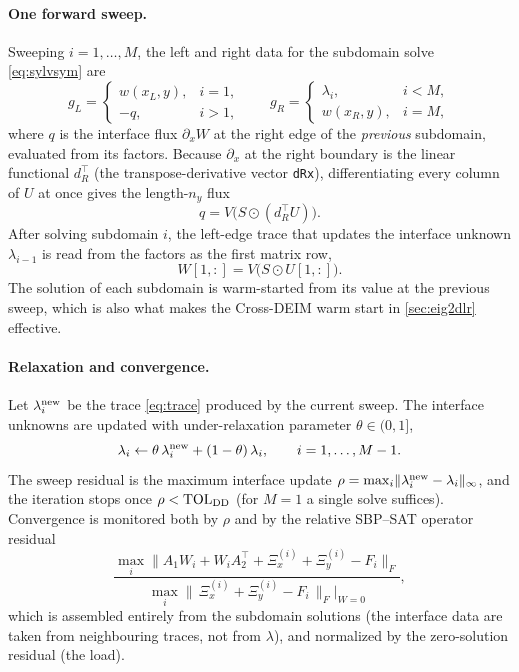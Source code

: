 \documentclass[hidelinks,onefignum,onetabnum]{siamart250211}
\newcommand{\Aone}{A_1}
\newcommand{\Atwo}{A_2}
\newcommand{\fro}[1]{\lVert #1 \rVert_{F}}
\newcommand{\TOL}{\mathrm{TOL}}
\begin{document}
\paragraph{One forward sweep.}  Sweeping $i=1,\dots,M$, the left and right data
for the subdomain solve \cref{eq:sylvsym} are
\begin{equation}
\label{eq:dndata}
g_L =
\begin{cases}
 w(x_L, y), & i=1,\\
 -q, & i>1,
\end{cases}
\qquad
g_R =
\begin{cases}
 \lambda_i, & i<M,\\
 w(x_R, y), & i=M,
\end{cases}
\end{equation}
where $q$ is the interface flux $\partial_x W$ at the right edge of the
\emph{previous} subdomain, evaluated from its factors.  Because $\partial_x$ at
the right boundary is the linear functional $d_R^{\!\top}$ (the
transpose-derivative vector {\tt dRx}), differentiating every column of $U$ at
once gives the length-$n_y$ flux
\begin{equation}
\label{eq:flux}
q = V\bigl(S \odot (d_R^{\!\top} U)\bigr).
\end{equation}
After solving subdomain $i$, the left-edge trace that updates the interface
unknown $\lambda_{i-1}$ is read from the factors as the first matrix row,
\begin{equation}
\label{eq:trace}
W[1,:] = V\bigl(S \odot U[1,:]\bigr).
\end{equation}
The solution of each subdomain is warm-started from its value at the previous
sweep, which is also what makes the Cross-DEIM warm start in
\cref{sec:eig2dlr} effective.

\paragraph{Relaxation and convergence.}  Let $\lambda_i^{\rm new}$ be the trace
\cref{eq:trace} produced by the current sweep.  The interface unknowns are
updated with under-relaxation parameter $\theta\in(0,1]$,
\begin{equation}
\label{eq:relax}
\lambda_i \leftarrow \theta\,\lambda_i^{\rm new} + (1-\theta)\,\lambda_i,
\qquad i=1,\dots,M-1.
\end{equation}
The sweep residual is the maximum interface update
$\rho = \max_i \lVert \lambda_i^{\rm new} - \lambda_i\rVert_\infty$, and the
iteration stops once $\rho < \TOL_{\rm DD}$ (for $M=1$ a single solve suffices).
Convergence is monitored both by $\rho$ and by the relative SBP--SAT operator
residual
\begin{equation}
\label{eq:opres}
\frac{\max_i \fro{\Aone W_i + W_i \Atwo^{\!\top} + \Xi_x^{(i)} + \Xi_y^{(i)} - F_i}}
     {\max_i \fro{\,\Xi_x^{(i)} + \Xi_y^{(i)} - F_i\,}\big|_{W=0}},
\end{equation}
which is assembled entirely from the subdomain solutions (the interface data are
taken from neighbouring traces, not from $\lambda$), and normalized by the
zero-solution residual (the load).
\end{document}
